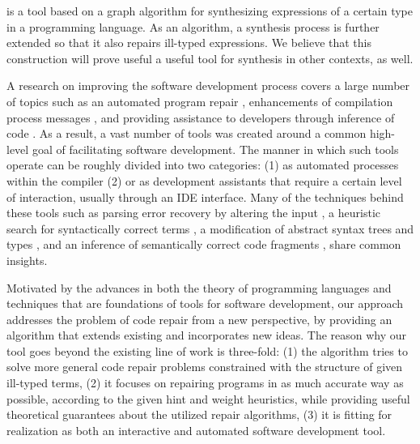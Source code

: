 \ourTool is a tool based on a graph algorithm for synthesizing expressions of a certain type in a programming language. As an algorithm, a synthesis process is further 
extended so that it also repairs ill-typed expressions. We believe that this construction will prove useful a useful tool for synthesis in other contexts, as well.



A research on improving the software development process covers a large number of topics such as an automated
program repair
\cite{LeGoues:2012:ROI:2330163.2330296,WeiETAL10AutomatedFixingProgramsContracts,PeiETAL11CodebasedAutomatedProgramFixing},
enhancements of compilation process messages
\cite{Burke87apractical,Hammond198451,Lerner:2007:STM:1250734.1250783}, and
providing assistance to developers through inference of code
\cite{GveroETAL13CompleteCompletionTypesWeights,MandelinetALL2005Jungloid,KneussETAL13SynthesisModuloRecursiveFunctions,KuncakETAL13ExecutingSpecificationsSynthesisConstraintSolvingInvitedTalk,PerelmanGBG12}.
As a result, a vast number of tools was created around a common
high-level goal of facilitating software development.
The manner in which such tools operate can be roughly divided into two
categories: (1) as automated processes within the compiler 
(2) or as development assistants that require a certain level of
interaction, usually through an IDE interface.
Many of the techniques behind these tools such as parsing error recovery by altering the
input \cite{Burke87apractical}, a heuristic search for syntactically
correct terms \cite{PerelmanGBG12}, a modification of
abstract syntax trees and types \cite{Lerner:2007:STM:1250734.1250783}, and an inference
of semantically correct code fragments
\cite{KneussETAL13SynthesisModuloRecursiveFunctions}, share common insights.

Motivated by the advances in both the theory of programming languages and
techniques that are foundations of tools for software development, our
approach addresses the problem of code repair from a new perspective,
by providing an algorithm that extends existing and incorporates new
ideas.  The reason why our tool goes beyond the existing line of
work is three-fold: (1) the algorithm tries to solve more general code
repair problems constrained with the structure of given ill-typed
terms, (2) it focuses on repairing programs in as much accurate way as
possible, according to the given hint and weight heuristics, while
providing useful theoretical guarantees about the utilized repair
algorithms, (3) it is fitting for realization as both an interactive
and automated software development tool.

